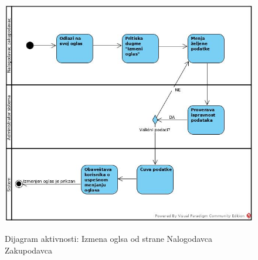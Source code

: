 \documentclass[20pt]{article}
\begin{document}
\begin{figure}[h]
        \centering
        \includegraphics[width=1.1\textwidth,height=0.59\textheight]{Pictures/IzmenaOglasaOdStraneKorisnika.jpg}\\
        \caption{Dijagram aktivnosti: Izmena oglsa od strane Nalogodavca Zakupodavca}
        \label{fig:dijagramAktivnostiIzmeneOglasa}
    \end{figure}
\end{document}
